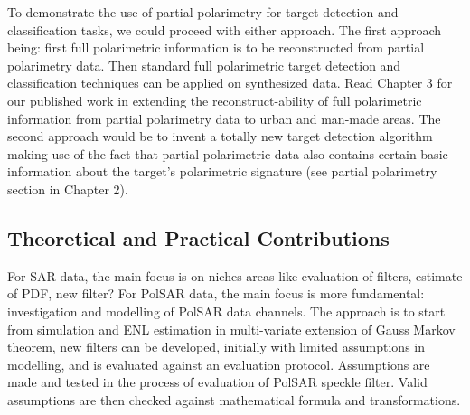 
To demonstrate the use of partial polarimetry for target detection and classification tasks, we could proceed with either approach.
The first approach being: first full polarimetric information is to be reconstructed from partial polarimetry data.
Then standard full polarimetric target detection and classification techniques can be applied on synthesized data.
Read Chapter 3 for our published work in extending the reconstruct-ability of full polarimetric information from partial polarimetry data to urban and man-made areas.
The second approach would be to invent a totally new target detection algorithm making use of the fact that partial polarimetric data also contains certain basic information about the target's polarimetric signature (see partial polarimetry section in Chapter 2).

\subsection{Theoretical and Practical Contributions}

For SAR data, the main focus is on niches areas like evaluation of filters, estimate of PDF, new filter?
For PolSAR data, the main focus is more fundamental: investigation and modelling of PolSAR data channels. 
The approach is to start from simulation and ENL estimation in multi-variate extension of Gauss Markov theorem, 
new filters can be developed, initially with limited assumptions in modelling, and is evaluated against an evaluation protocol.
Assumptions are made and tested in the process of evaluation of PolSAR speckle filter. 
Valid assumptions are then checked against mathematical formula and transformations.

